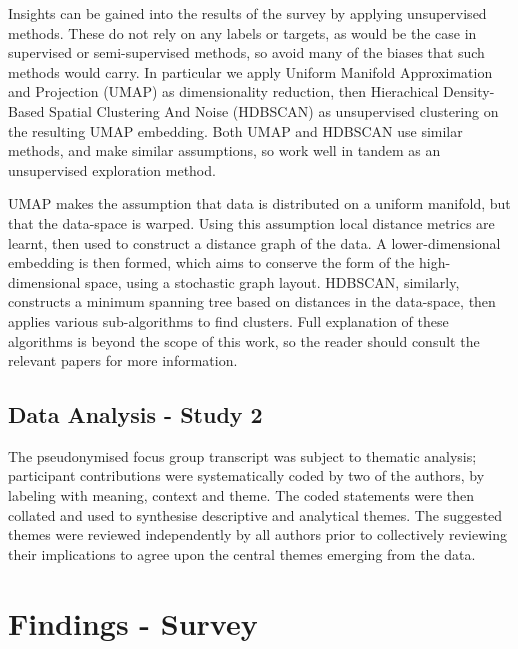 \documentclass[manuscript,screen,review]{acmart}
\begin{document}
Insights can be gained into the results of the survey by applying unsupervised methods. These do not rely on any labels or targets, as would be the case in supervised or semi-supervised methods, so avoid many of the biases that such methods would carry. In particular we apply Uniform Manifold Approximation and Projection (UMAP) \cite{McInnes2018} as dimensionality reduction, then Hierachical Density-Based Spatial Clustering And Noise (HDBSCAN) \cite{McInnes2017} as unsupervised clustering on the resulting UMAP embedding. Both UMAP and HDBSCAN use similar methods, and make similar assumptions, so work well in tandem as an unsupervised exploration method.

UMAP makes the assumption that data is distributed on a uniform manifold, but that the data-space is warped. Using this assumption local distance metrics are learnt, then used to construct a distance graph of the data. A lower-dimensional embedding is then formed, which aims to conserve the form of the high-dimensional space, using a stochastic graph layout. HDBSCAN, similarly, constructs a minimum spanning tree based on distances in the data-space, then applies various sub-algorithms to find clusters. Full explanation of these algorithms is beyond the scope of this work, so the reader should consult the relevant papers for more information. 

\subsection{Data Analysis - Study 2}
\label{study2_data_analysis}

The pseudonymised focus group transcript was subject to thematic analysis; participant contributions were systematically coded by two of the authors, by labeling with meaning, context and theme. The coded statements were then collated and used to synthesise descriptive and analytical themes. The suggested themes were reviewed independently by all authors prior to collectively reviewing their implications to agree upon the central themes emerging from the data.    



\newpage
\section{Findings - Survey}
\end{document}
